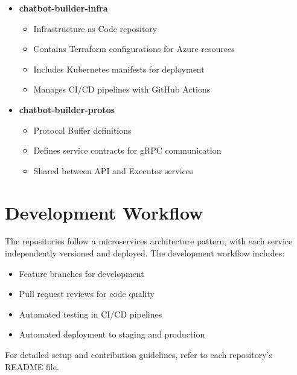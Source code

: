 \begin{itemize}
    \item \textbf{chatbot-builder-infra}
    \begin{itemize}
        \item Infrastructure as Code repository
        \item Contains Terraform configurations for Azure resources
        \item Includes Kubernetes manifests for deployment
        \item Manages CI/CD pipelines with GitHub Actions
    \end{itemize}
    
    \item \textbf{chatbot-builder-protos}
    \begin{itemize}
        \item Protocol Buffer definitions
        \item Defines service contracts for gRPC communication
        \item Shared between API and Executor services
    \end{itemize}
\end{itemize}

\section{Development Workflow}
The repositories follow a microservices architecture pattern, with each service independently versioned and deployed. The development workflow includes:
\begin{itemize}
    \item Feature branches for development
    \item Pull request reviews for code quality
    \item Automated testing in CI/CD pipelines
    \item Automated deployment to staging and production
\end{itemize}

For detailed setup and contribution guidelines, refer to each repository's README file. 